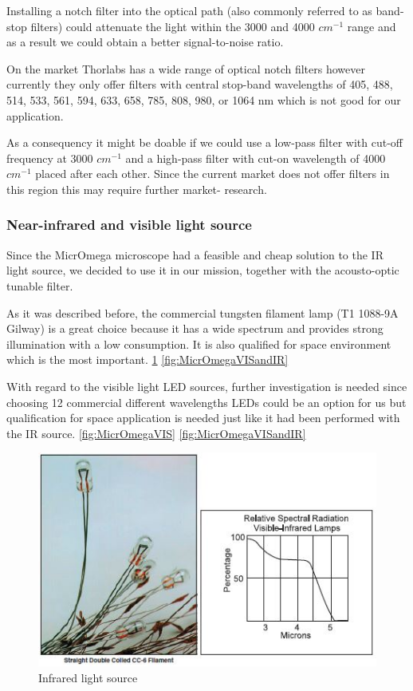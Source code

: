 Installing a notch filter into the optical path (also commonly referred to as band-stop filters) could attenuate the light within the 3000 and 4000 $cm^{-1}$ range and as a result we could obtain a better signal-to-noise ratio.

On the market Thorlabs has a wide range of optical notch filters however currently they only offer filters with central stop-band wavelengths of 405, 488, 514, 533, 561, 594, 633, 658, 785, 808, 980, or 1064 nm which is not good for our application.
\cite{filters}

As a consequency it might be doable if we could use a low-pass filter with cut-off frequency at 3000 $cm^{-1}$ and a high-pass filter with cut-on wavelength of 4000 $cm^{-1}$ placed after each other. Since the current market does not offer filters in this region this may require further market- research.

\subsubsection{Near-infrared and visible light source}

Since the MicrOmega microscope had a feasible and cheap solution to the IR light source, we decided to use it in our mission, together with the acousto-optic tunable filter. 

As it was described before, the commercial tungsten filament lamp (T1 1088-9A Gilway) is a great choice because it has a wide spectrum and provides strong illumination with a low consumption. It is also qualified for space environment which is the most important.
\ref{fig:IR_light_source}
\ref{fig:MicrOmegaVISandIR}

With regard to the visible light LED sources, further investigation is needed since choosing 12 commercial different wavelengths LEDs  could be an option for us but qualification for space application is needed just like it had been performed with the IR source.
\ref{fig:MicrOmegaVIS}
\ref{fig:MicrOmegaVISandIR}

\begin{figure}[htb]
  \centering
  \includegraphics[scale=0.6]{figures/BFfig/IR_light_source}
  \caption{Infrared light source \cite{halogenlamp}}
  \label{fig:IR_light_source}
\end{figure}


